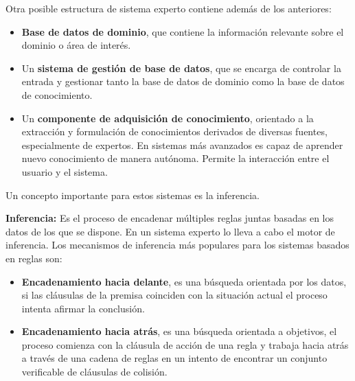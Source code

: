 \documentclass[12pt, twoside, openright]{report} %
\begin{document}
Otra posible estructura de sistema experto contiene además de los anteriores:
\begin{itemize}
	\item \textbf{Base de datos de dominio}, que contiene la información relevante sobre el dominio o área de interés.
	\item Un \textbf{sistema de gestión de base de datos}, que se encarga de controlar la entrada y gestionar tanto la base de datos de dominio como la base de datos de conocimiento.
	\item Un \textbf{componente de adquisición de conocimiento},  orientado a la extracción y formulación de conocimientos derivados de diversas fuentes, especialmente de expertos. En sistemas más avanzados es capaz de aprender nuevo conocimiento de manera autónoma. Permite la interacción entre el usuario  y el sistema.
\end{itemize}

Un concepto importante para estos sistemas es la inferencia.

\textbf{Inferencia:} Es el proceso de encadenar múltiples reglas juntas basadas en los datos de los que se dispone. En un sistema experto lo lleva a cabo el motor de inferencia. Los mecanismos de inferencia más populares para los sistemas basados en reglas son:
\begin{itemize}
	\item \textbf{Encadenamiento hacia delante}, es una búsqueda orientada por los datos, si las cláusulas de la premisa coinciden con la situación actual el proceso intenta afirmar la conclusión.
	\item \textbf{Encadenamiento hacia atrás}, es una búsqueda orientada a objetivos, el proceso comienza con la cláusula de acción de una regla y  trabaja hacia atrás a través de una cadena de reglas en un intento de encontrar un conjunto verificable de cláusulas de colisión.
\end{itemize}
\end{document}
